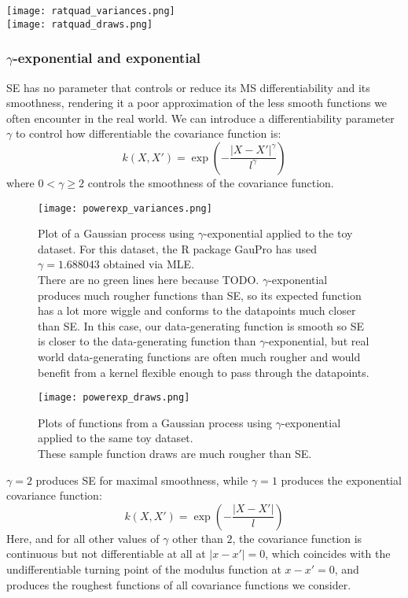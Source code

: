 \texttt{[image: ratquad\_variances.png]} \\
\texttt{[image: ratquad\_draws.png]} \\


\subsubsection{$\gamma$-exponential and exponential}
SE has no parameter that controls or reduce its MS differentiability and its smoothness, rendering it a poor approximation of the less smooth functions we often encounter in the real world. We can introduce a differentiability parameter $\gamma$ to control how differentiable the covariance function is:
\begin{equation*}
    k(X,X') = \exp \left(-\frac{|X - X'|^{\gamma}}{l^{\gamma}} \right)
\end{equation*}
where $0 < \gamma \geq 2$ controls the smoothness of the covariance function. 

\begin{figure}[H]
    \texttt{[image: powerexp\_variances.png]}
    \caption{
        Plot of a Gaussian process using $\gamma$-exponential applied to the toy dataset. For this dataset, the R package GauPro \cite{gaopro} has used $\gamma = 1.688043$ obtained via MLE. \\
        There are no green lines here because TODO. $\gamma$-exponential produces much rougher functions than SE, so its expected function has a lot more wiggle and conforms to the datapoints much closer than SE. In this case, our data-generating function is smooth so SE is closer to the data-generating function than $\gamma$-exponential, but real world data-generating functions are often much rougher and would benefit from a kernel flexible enough to pass through the datapoints.
    }
\end{figure}

\begin{figure}[H]
    \texttt{[image: powerexp\_draws.png]}
    \caption{
        Plots of functions from a Gaussian process using $\gamma$-exponential applied to the same toy dataset. \\
        These sample function draws are much rougher than SE.
    }
\end{figure}

$\gamma = 2$ produces SE for maximal smoothness, while $\gamma = 1$ produces the exponential covariance function:
\begin{equation*}
    k(X,X') = \exp \left(-\frac{|X - X'|}{l} \right)
\end{equation*}
Here, and for all other values of $\gamma$ other than $2$, the covariance function is continuous but not differentiable at all at $|x - x'| = 0$, which coincides with the undifferentiable turning point of the modulus function at $x - x' = 0$, and produces the roughest functions of all covariance functions we consider.

